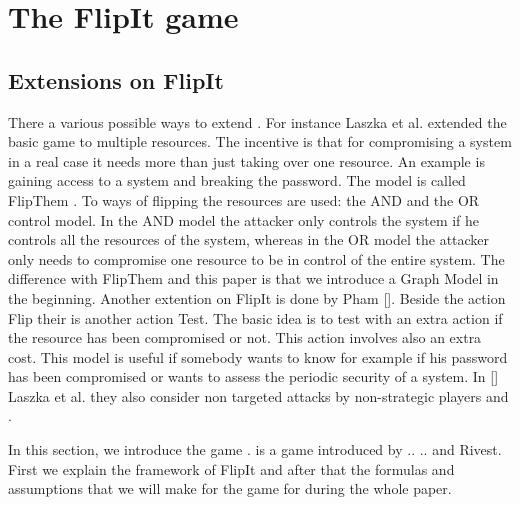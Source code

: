 \chapter{The FlipIt game}
\label{cha:2}


\section{Extensions on FlipIt}


There a various possible ways to extend . For instance Laszka et al. extended the basic  game to multiple resources. The incentive is that for compromising a system in a real case it needs more than just taking over one resource. An example is gaining access to a system and breaking the password. The model is called FlipThem \cite{FlipThem}. To ways of flipping the resources are used: the AND and the OR control model. In the AND model the attacker only controls the system if he controls all the resources of the system, whereas in the OR model the attacker only needs to compromise one resource to be in control of the entire system. The difference with FlipThem and this paper is that we introduce a Graph Model in the beginning.
Another extention on FlipIt is done by Pham []. Beside the action Flip their is another action Test. The basic idea is to test with an extra action if the resource has been compromised or not. This action involves also an extra cost. This model is useful if somebody wants to know for example if his password has been compromised or wants to assess the periodic security of a system.  In [] \cite{MitigationNonTargeted} Laszka et al. they also consider non targeted attacks by non-strategic players and . 








In this section, we introduce the game  \cite{FlipIt}.  is a game introduced by .. .. and Rivest. First we explain the framework of FlipIt and after that the formulas and assumptions that we will make for the game for during the whole paper.  

